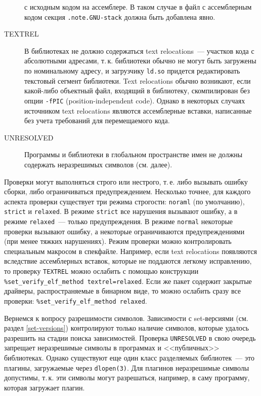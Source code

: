 \documentclass[russian,a4paper,12pt,titlepage]{article}
\begin{document}
\begin{description}
с исходным кодом на ассемблере.  В таком случае в файл с ассемблерным кодом секция \verb|.note.GNU-stack| должна быть добавлена явно.
\item[TEXTREL] В библиотеках не должно содержаться text relocations~--- участков кода с абсолютными адресами, т.\,к. библиотеки
обычно не могут быть загружены по номинальному адресу, и загрузчику \verb|ld.so| придется редактировать текстовый сегмент библиотеки.
Text relocations обычно возникают, если какой-либо объектный файл, входящий в библиотеку, скомпилирован без опции \verb|-fPIC|
(position-independent code).  Однако в некоторых случаях источником text relocations являются ассемблерные вставки, написанные
без учета требований для перемещаемого кода.
\item[UNRESOLVED] Программы и библиотеки в глобальном пространстве имен не должны содержать неразрешимых символов (см. далее).
\end{description}

Проверки могут выполняться строго или нестрого, т.\,е. либо вызывать ошибку сборки, либо ограничиваться предупреждением.
Несколько точнее, для каждого аспекта проверки существует три режима строгости: \verb|noraml| (по умолчанию), \verb|strict|
и \verb|relaxed|.  В режиме \verb|strict| все нарушения вызывают ошибку, а в режиме \verb|relaxed|~--- только предупреждения.
В режиме \verb|normal| некоторые проверки вызывают ошибку, а некоторые ограничиваются предупреждениями (при менее тяжких нарушениях).
Режим проверки можно контролировать специальным макросом в спекфайле.  Например, если text relocations появляются вследствие
ассемблерных вставок, которые не поддаются легкому исправлению, то проверку \verb|TEXTREL| можно ослабить с помощью конструкции
\verb|%set_verify_elf_method textrel=relaxed|.
Если же пакет содержит закрытые драйверы, распространяемые в бинарном виде, то можно ослабить сразу все проверки:
\verb|%set_verify_elf_method relaxed|.

Вернемся к вопросу разрешимости символов.  Зависимости с set-версиями (см. раздел \ref{set-versions})
контролируют только наличие символов, которые удалось разрешить на стадии поиска зависимостей.  Проверка \verb|UNRESOLVED|
в свою очередь запрещает неразрешимые символы в программах и <<публичных>> библиотеках.  Однако существуют
еще один класс разделяемых библиотек~--- это плагины, загружаемые через \verb|dlopen(3)|.  Для плагинов неразрешимые
символы допустимы, т.\,к. эти символы могут разрешаться, например, в саму программу, которая загружает плагин.
\end{document}

